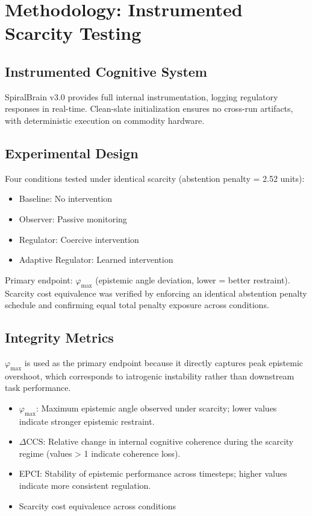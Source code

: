 \documentclass[12pt,a4paper]{article}
\theoremstyle{plain}
\theoremstyle{definition}
\theoremstyle{remark}
\begin{document}
\section{Methodology: Instrumented Scarcity Testing}

\subsection{Instrumented Cognitive System}

SpiralBrain v3.0 provides full internal instrumentation, logging regulatory responses in real-time. Clean-slate initialization ensures no cross-run artifacts, with deterministic execution on commodity hardware.

\subsection{Experimental Design}

Four conditions tested under identical scarcity (abstention penalty = 2.52 units):
\begin{itemize}
 \item Baseline: No intervention
    \item Observer: Passive monitoring
    \item Regulator: Coercive intervention
    \item Adaptive Regulator: Learned intervention
\end{itemize}

Primary endpoint: $\varphi_{\max}$ (epistemic angle deviation, lower = better restraint).
Scarcity cost equivalence was verified by enforcing an identical abstention penalty schedule and confirming equal total penalty exposure across conditions.

\subsection{Integrity Metrics}

$\varphi_{\max}$ is used as the primary endpoint because it directly captures peak epistemic overshoot, which corresponds to iatrogenic instability rather than downstream task performance.

\begin{itemize}
    \item $\varphi_{\max}$: Maximum epistemic angle observed under scarcity; lower values indicate stronger epistemic restraint.
    \item $\Delta \mathrm{CCS}$: Relative change in internal cognitive coherence during the scarcity regime (values > 1 indicate coherence loss).
    \item EPCI: Stability of epistemic performance across timesteps; higher values indicate more consistent regulation.
    \item Scarcity cost equivalence across conditions
\end{itemize}
\end{document}
